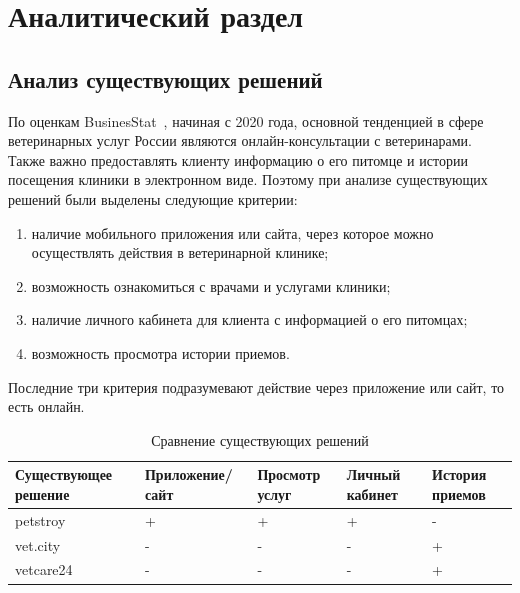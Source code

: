 \section{Аналитический раздел}

\subsection{Анализ существующих решений}

По оценкам BusinesStat~\cite{businesstat}, начиная с 2020 года, основной тенденцией в сфере ветеринарных услуг России являются онлайн-консультации с ветеринарами. Также важно предоставлять клиенту информацию о его питомце и истории посещения клиники в электронном виде. Поэтому при анализе существующих решений были выделены следующие критерии:
\begin{enumerate}[label*=---]
	\item наличие мобильного приложения или сайта, через которое можно осуществлять действия в ветеринарной клинике;
	\item возможность ознакомиться с врачами и услугами клиники;
 	\item наличие личного кабинета для клиента с информацией о его питомцах;
 	\item возможность просмотра истории приемов.
 \end{enumerate}

Последние три критерия подразумевают действие через приложение или сайт, то есть онлайн.

\begin{table}[hbtp]
	\begin{center}
		\begin{flushleft}
			\captionsetup{justification=raggedright, singlelinecheck=false}
			\caption{\label{tab:solve}Сравнение существующих решений}
		\end{flushleft}
		\begin{tabular}{|  p{} | p{} | p{}  |  p{} | p{}|} 
			\hline  Существующее решение &Приложение/ сайт & Просмотр услуг  & Личный кабинет & История приемов \\ \hline
			
			petstroy~\cite{petstory} &   + &   + & + & - \\ \hline
			vet.city~\cite{vetcity} &   - &   - & - & +  \\ \hline
			vetcare24~\cite{vetcare24} &  - &  - & - & + \\ \hline
		\end{tabular}
	\end{center}
\end{table}

